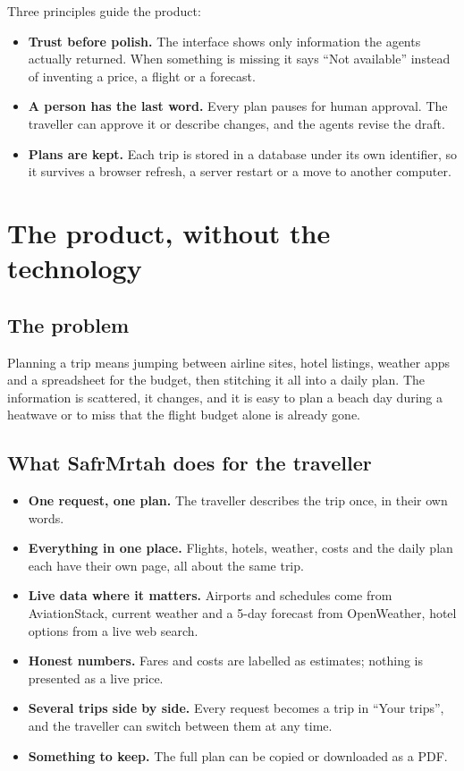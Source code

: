\documentclass[11pt,a4paper]{article}
\begin{document}
Three principles guide the product:

\begin{itemize}
  \item \textbf{Trust before polish.} The interface shows only information the agents actually returned. When something is missing it says ``Not available'' instead of inventing a price, a flight or a forecast.
  \item \textbf{A person has the last word.} Every plan pauses for human approval. The traveller can approve it or describe changes, and the agents revise the draft.
  \item \textbf{Plans are kept.} Each trip is stored in a database under its own identifier, so it survives a browser refresh, a server restart or a move to another computer.
\end{itemize}

\section{The product, without the technology}

\subsection{The problem}
Planning a trip means jumping between airline sites, hotel listings, weather apps and a spreadsheet for the budget, then stitching it all into a daily plan. The information is scattered, it changes, and it is easy to plan a beach day during a heatwave or to miss that the flight budget alone is already gone.

\subsection{What SafrMrtah does for the traveller}
\begin{itemize}
  \item \textbf{One request, one plan.} The traveller describes the trip once, in their own words.
  \item \textbf{Everything in one place.} Flights, hotels, weather, costs and the daily plan each have their own page, all about the same trip.
  \item \textbf{Live data where it matters.} Airports and schedules come from AviationStack, current weather and a 5-day forecast from OpenWeather, hotel options from a live web search.
  \item \textbf{Honest numbers.} Fares and costs are labelled as estimates; nothing is presented as a live price.
  \item \textbf{Several trips side by side.} Every request becomes a trip in ``Your trips'', and the traveller can switch between them at any time.
  \item \textbf{Something to keep.} The full plan can be copied or downloaded as a PDF.
\end{itemize}
\end{document}
